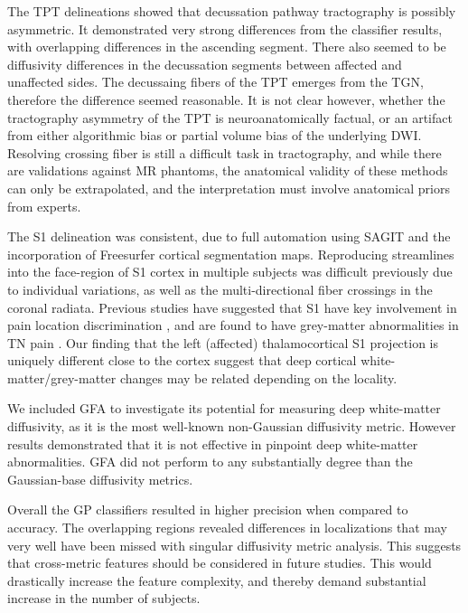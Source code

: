 The TPT delineations showed that decussation pathway tractography is possibly asymmetric. It demonstrated very strong differences from the classifier results, with overlapping differences in the ascending segment. There also seemed to be diffusivity differences in the decussation segments between affected and unaffected sides. The decussaing fibers of the TPT emerges from the TGN, therefore the difference seemed reasonable. It is not clear however, whether the tractography asymmetry of the TPT is neuroanatomically factual, or an artifact from either algorithmic bias or partial volume bias of the underlying DWI. Resolving crossing fiber is still a difficult task in tractography, and while there are validations against MR phantoms, the anatomical validity of these methods can only be extrapolated, and the interpretation must involve anatomical priors from experts.  

The S1 delineation was consistent, due to full automation using SAGIT and the incorporation of Freesurfer cortical segmentation maps. Reproducing streamlines into the face-region of S1 cortex in multiple subjects was difficult previously due to individual variations, as well as the multi-directional fiber crossings in the coronal radiata. Previous studies have suggested that S1 have key involvement in pain location discrimination \cite{bushnell1999pain}, and are found to have grey-matter abnormalities in TN pain \cite{Desouza2013c}. Our finding that the left (affected) thalamocortical S1 projection is uniquely different close to the cortex suggest that deep cortical white-matter/grey-matter changes may be related depending on the locality. 

We included GFA to investigate its potential for measuring deep white-matter diffusivity, as it is the most well-known non-Gaussian diffusivity metric. However results demonstrated that it is not effective in pinpoint deep white-matter abnormalities. GFA did not perform to any substantially degree than the Gaussian-base diffusivity metrics. 

Overall the GP classifiers resulted in higher precision when compared to accuracy. The overlapping regions revealed differences in localizations that may very well have been missed with singular diffusivity metric analysis. This suggests that cross-metric features should be considered in future studies. This would drastically increase the feature complexity, and thereby demand substantial increase in the number of subjects. 


